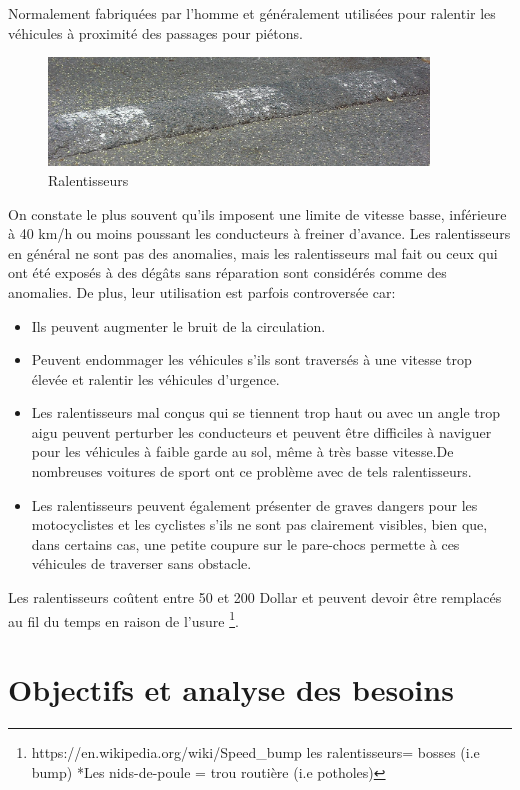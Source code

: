 Normalement fabriquées par l'homme et généralement utilisées pour ralentir les véhicules à proximité des passages pour piétons.
\begin{figure}[h!]
    \center
    \includegraphics[width=0.9\textwidth]{Images/chapter1/Speedbump.jpg}
    \caption{Ralentisseurs}
    \end{figure}
    On constate le plus souvent qu’ils imposent une limite de vitesse basse, inférieure à 40 km/h ou moins poussant les conducteurs à freiner d’avance.
    Les ralentisseurs en général ne sont pas des anomalies, mais les ralentisseurs mal fait ou ceux qui ont été exposés à des dégâts sans réparation sont considérés comme des anomalies.  
    De plus, leur utilisation est parfois controversée car:
 \begin{itemize}
    \item Ils peuvent augmenter le bruit de la circulation.
    \item Peuvent endommager les véhicules s'ils sont traversés à une vitesse trop élevée et ralentir les véhicules d'urgence.
    \item Les ralentisseurs mal conçus qui se tiennent trop haut ou avec un angle
      trop aigu peuvent perturber les conducteurs et peuvent être difficiles à naviguer pour les véhicules à faible garde au sol,
      même à très basse vitesse.De nombreuses voitures de sport ont ce problème avec de tels ralentisseurs. 
    \item Les ralentisseurs peuvent également présenter de graves dangers pour les motocyclistes et les cyclistes s'ils ne sont pas
    clairement visibles, bien que, dans certains cas, une petite coupure sur le pare-chocs permette à ces véhicules de
     traverser sans obstacle.
  \end{itemize}

  Les ralentisseurs coûtent entre 50 et 200 Dollar et peuvent devoir être remplacés au fil du temps 
   en raison de l'usure 
   \footnote{https://en.wikipedia.org/wiki/Speed\_bump \newline *les ralentisseurs= bosses (i.e bump) *Les nids-de-poule = trou routière (i.e potholes)}. 

\section{Objectifs et analyse des besoins}

